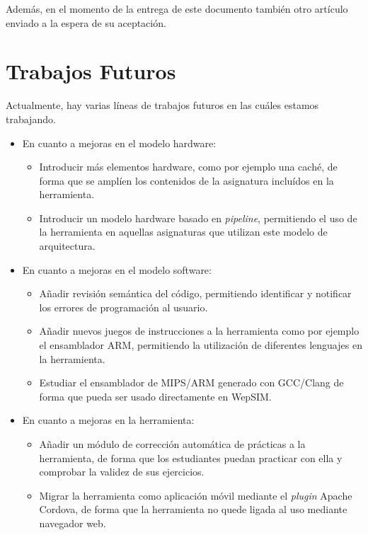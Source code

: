 Además, en el momento de la entrega de este documento también otro artículo enviado a la espera de su aceptación.

\section{Trabajos Futuros}

Actualmente, hay varias líneas de trabajos futuros en las cuáles estamos trabajando.

\begin{itemize}

\item En cuanto a mejoras en el modelo hardware:

\begin{itemize}

\item Introducir más elementos hardware, como por ejemplo una caché, de forma que se amplíen los contenidos de la asignatura incluídos en la herramienta.

\item Introducir un modelo hardware basado en \textit{pipeline}, permitiendo el uso de la herramienta en aquellas asignaturas que utilizan este modelo de arquitectura. 

\end{itemize}

\item En cuanto a mejoras en el modelo software:

\begin{itemize}

\item Añadir revisión semántica del código, permitiendo identificar y notificar los errores de programación al usuario.

\item Añadir nuevos juegos de instrucciones a la herramienta como por ejemplo el ensamblador ARM, permitiendo la utilización de diferentes lenguajes en la herramienta.

\item Estudiar el ensamblador de MIPS/ARM generado con GCC/Clang de forma que pueda ser usado directamente en WepSIM.

\end{itemize}

\item En cuanto a mejoras en la herramienta:

\begin{itemize}

\item Añadir un módulo de corrección automática de prácticas a la herramienta, de forma que los estudiantes puedan practicar con ella y comprobar la validez de sus ejercicios.

\item Migrar la herramienta como aplicación móvil mediante el \emph{plugin} Apache Cordova, de forma que la herramienta no quede ligada al uso mediante navegador web.

\end{itemize}

\end{itemize}

